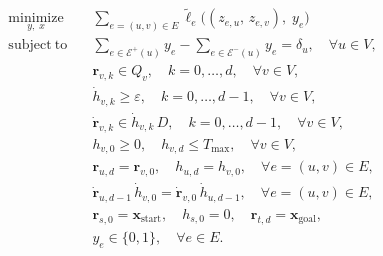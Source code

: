 \begin{subequations}
    \label{eq:GCS-Bézier_full}
    \begin{align}
        \underset{y,\; x}{\mathrm{minimize}} \quad
         & \sum_{e=(u,v) \in E} \tilde{\ell}_e\!\bigl(
        (z_{e,u},\, z_{e,v}),\; y_e
        \bigr)
        \label{eq:bgcs_obj}                                                                  \\
        \mathrm{subject\ to} \quad
         & \sum_{e \in \mathcal{E}^+(u)} y_e - \sum_{e \in \mathcal{E}^-(u)} y_e = \delta_u,
        \quad \forall u \in V,
        \label{eq:bgcs_flow}                                                                 \\
         & \mathbf{r}_{v,k} \in Q_v,
        \quad k = 0, \ldots, d,\quad \forall v \in V,
        \label{eq:bgcs_geo}                                                                  \\
         & \dot{h}_{v,k} \ge \varepsilon,
        \quad k = 0, \ldots, d-1,\quad \forall v \in V,
        \label{eq:bgcs_mono}                                                                 \\
         & \dot{\mathbf{r}}_{v,k} \in \dot{h}_{v,k}\, D,
        \quad k = 0, \ldots, d-1,\quad \forall v \in V,
        \label{eq:bgcs_vel}                                                                  \\
         & h_{v,0} \ge 0,\quad h_{v,d} \le T_{\max},\quad \forall v \in V,
        \label{eq:bgcs_time}                                                                 \\
         & \mathbf{r}_{u,d} = \mathbf{r}_{v,0},\quad
        h_{u,d} = h_{v,0},
        \quad \forall e=(u,v) \in E,
        \label{eq:bgcs_c0}                                                                   \\
         & \dot{\mathbf{r}}_{u,d-1}\, \dot{h}_{v,0}
        = \dot{\mathbf{r}}_{v,0}\, \dot{h}_{u,d-1},
        \quad \forall e=(u,v) \in E,
        \label{eq:bgcs_c1}                                                                   \\
         & \mathbf{r}_{s,0} = \mathbf{x}_{\mathrm{start}},\quad
        h_{s,0} = 0,\quad
        \mathbf{r}_{t,d} = \mathbf{x}_{\mathrm{goal}},
        \label{eq:bgcs_bc}                                                                   \\
         & y_e \in \{0,1\},\quad \forall e \in E.
        \label{eq:bgcs_bin}
    \end{align}
\end{subequations}


